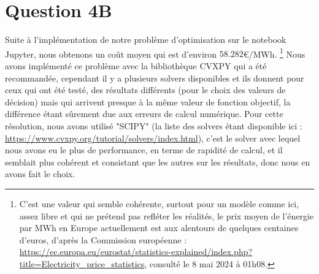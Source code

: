 \documentclass{article}
\begin{document}
\section*{Question 4B}
Suite à l'implémentation de notre problème d'optimisation sur le notebook Jupyter, nous obtenons 
un coût moyen qui est d'environ $\mathbf{58.282}$\euro/MWh. \footnote{C'est une valeur qui semble cohérente, surtout pour un modèle comme ici, 
assez libre et qui ne prétend pas refléter les réalités, le prix moyen de l'énergie par MWh en Europe actuellement 
est aux alentours de quelques centaines d'euros, d'après la Commission européenne : 
\url{https://ec.europa.eu/eurostat/statistics-explained/index.php?title=Electricity_price_statistics}, 
consulté le 8 mai 2024 à 01h08.} Nous avons implémenté ce problème avec la bibliothèque CVXPY qui a été recommandée, cependant
il y a plusieurs solvers disponibles et ils donnent pour ceux qui ont été testé, des résultats différents (pour le choix des valeurs de décision) mais qui arrivent presque à
la même valeur de fonction objectif, la différence étant sûrement due aux erreurs de calcul numérique. Pour cette résolution,
nous avons utilisé "SCIPY" (la liste des solvers étant disponible ici : \url{https://www.cvxpy.org/tutorial/solvers/index.html}), c'est le solver
avec lequel nous avons eu le plus de performance, en terme de rapidité de calcul, et il semblait plus cohérent et consistant que les autres
sur les résultats, donc nous en avons fait le choix.
\end{document}
